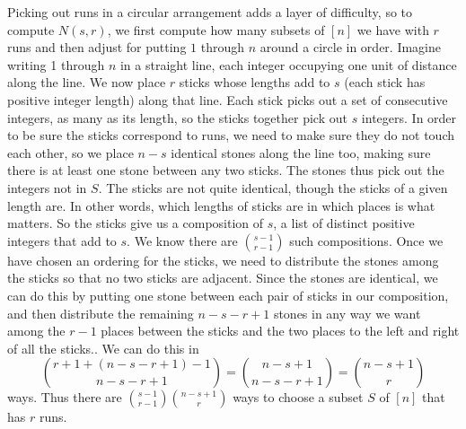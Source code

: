 \begin{enumerate}
{Picking out runs in a circular arrangement adds a layer of difficulty, so to
compute $N(s,r)$, we first compute how many subsets of $[n]$ we have with $r$
runs and then adjust for putting $1$ through $n$ around a circle in order.
Imagine writing 1 through
$n$ in a straight line, each integer occupying one unit of distance along the
line. We now place
$r$  sticks whose lengths add to
$s$ (each stick has positive integer length) along that line. Each stick
picks out a set of consecutive integers, as many as its length, so the
sticks together pick out $s$ integers.  In order to be sure the sticks
correspond to runs, we need to make sure they do not touch each other, so we
place $n-s$ identical stones along the line too, making sure there is at
least one stone between any two sticks.  The stones thus pick out the integers
not in $S$.  The sticks are not quite identical, though the sticks of a given
length are.  In other words, which lengths of sticks are in which places is
what matters.  So the sticks give us a composition of $s$, a list of distinct
positive integers that add to $s$.  We know there are $s-1\choose r-1$ such
compositions. Once we have chosen an ordering for the sticks, we need to
distribute the stones among the sticks so that no two sticks are adjacent. 
Since the stones are identical, we can do this by putting one stone between
each pair of sticks in our composition, and then distribute the remaining
$n-s-r+1$  stones in any way we want among the $r-1$ places between the sticks
and the two places to the left and right of all the sticks..  We can do this in
$${r+1 + (n-s-r+1)-1\choose n-s-r+1}={n-s+1\choose n-s-r+1}={n-s+1\choose r}$$
ways. Thus there are
${s-1\choose r-1}{n-s+1\choose r}$ ways to choose a subset $S$ of $[n]$ that
has
$r$ runs.

}
\end{enumerate}
